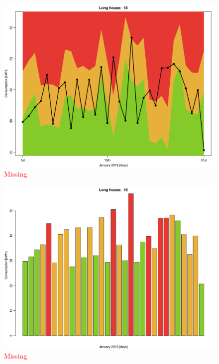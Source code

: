 \begin{figure}
    \centering
    \includegraphics[width=.8\textwidth]{../../../figures/lmpred_col_18L.pdf}
    \caption{\textcolor{red}{Missing}}
    \label{fig: lmpred_col_18L}
\end{figure}
\begin{figure}
    \centering
    \includegraphics[width=.8\textwidth]{../../../figures/lmpred_hist_18L.pdf}
    \caption{\textcolor{red}{Missing}}
    \label{fig: lmpred_hist_18L}
\end{figure}